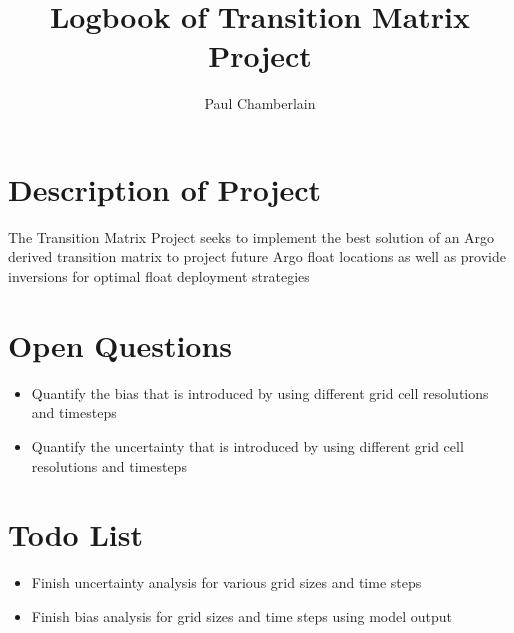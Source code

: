 \documentclass[english]{article}
\begin{document}
\title{Logbook of Transition Matrix Project}

\author{Paul Chamberlain}

\maketitle
\thispagestyle{fancy}


\tableofcontents
\section{Description of Project}
The Transition Matrix Project seeks to implement the best solution of an Argo derived transition matrix to project future Argo float locations as well as provide inversions for optimal float deployment strategies
\section{Open Questions}
\begin{itemize}
\item Quantify the bias that is introduced by using different grid cell resolutions and timesteps
\item Quantify the uncertainty that is introduced by using different grid cell resolutions and timesteps
\end{itemize}

\section{Todo List}
\begin{itemize}
\item Finish uncertainty analysis for various grid sizes and time steps
\item Finish bias analysis for grid sizes and time steps using model output
\end{itemize}
\end{document}

